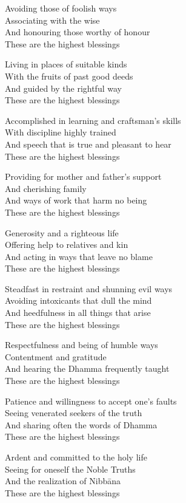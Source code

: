 Avoiding those of foolish ways\\
Associating with the wise\\
And honouring those worthy of honour\\
These are the highest blessings

Living in places of suitable kinds\\
With the fruits of past good deeds\\
And guided by the rightful way\\
These are the highest blessings

Accomplished in learning and craftsman’s skills\\
With discipline highly trained\\
And speech that is true and pleasant to hear\\
These are the highest blessings

Providing for mother and father’s support\\
And cherishing family\\
And ways of work that harm no being\\
These are the highest blessings

Generosity and a righteous life\\
Offering help to relatives and kin\\
And acting in ways that leave no blame\\
These are the highest blessings

Steadfast in restraint and shunning evil ways\\
Avoiding intoxicants that dull the mind\\
And heedfulness in all things that arise\\
These are the highest blessings

Respectfulness and being of humble ways\\
Contentment and gratitude\\
And hearing the Dhamma frequently taught\\
These are the highest blessings

Patience and willingness to accept one’s faults\\
Seeing venerated seekers of the truth\\
And sharing often the words of Dhamma\\
These are the highest blessings

Ardent and committed
to the holy life\\
Seeing for oneself the Noble Truths\\
And the realization of Nibbāna\\
These are the highest blessings

